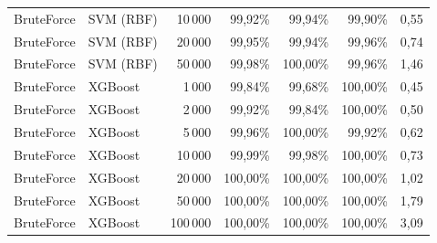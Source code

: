 {\begin{tabular}{@{}llrrrrr@{}}
BruteForce & SVM (RBF) & 10\,000 & 99,92\% & 99,94\% & 99,90\% & 0,55\\
\rowcolor{rowalt}BruteForce & SVM (RBF) & 20\,000 & 99,95\% & 99,94\% & 99,96\% & 0,74\\
BruteForce & SVM (RBF) & 50\,000 & 99,98\% & 100,00\% & 99,96\% & 1,46\\
\rowcolor{rowalt}BruteForce & XGBoost & 1\,000 & 99,84\% & 99,68\% & 100,00\% & 0,45\\
BruteForce & XGBoost & 2\,000 & 99,92\% & 99,84\% & 100,00\% & 0,50\\
\rowcolor{rowalt}BruteForce & XGBoost & 5\,000 & 99,96\% & 100,00\% & 99,92\% & 0,62\\
BruteForce & XGBoost & 10\,000 & 99,99\% & 99,98\% & 100,00\% & 0,73\\
\rowcolor{rowalt}BruteForce & XGBoost & 20\,000 & 100,00\% & 100,00\% & 100,00\% & 1,02\\
BruteForce & XGBoost & 50\,000 & 100,00\% & 100,00\% & 100,00\% & 1,79\\
\rowcolor{rowalt}BruteForce & XGBoost & 100\,000 & 100,00\% & 100,00\% & 100,00\% & 3,09\\
\bottomrule
\end{tabular}}%
